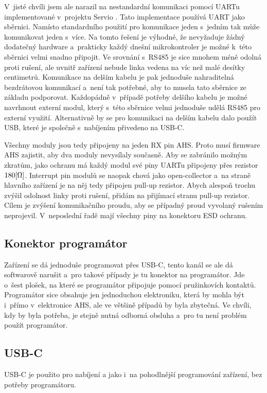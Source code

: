 V~jisté chvíli jsem ale narazil na nestandardní komunikaci pomocí UARTu implementované v~projektu Servio \cite{Servio}.
Tato implementace používá UART jako sběrnici.
Namísto standardního použití pro komunikace jeden s~jedním tak může komunikovat jeden s~více.
Na tomto řešení je výhodné, že nevyžaduje žádný dodatečný hardware a~prakticky každý dnešní mikrokontroler je možné k~této sběrnici velmi snadno připojit.
Ve srovnání s~RS485 je sice mnohem méně odolná proti rušení, ale uvnitř zařízení nebude linka vedena na víc než malé desítky centimetrů.
Komunikace na delším kabelu je pak jednoduše nahraditelná bezdrátovou komunikací a~není tak potřebné, aby to musela tato sběrnice ze základu podporovat.
Každopádně v~případě potřeby delšího kabelu je možné navrhnout externí modul, který s~této sběrnice velmi jednoduše udělá RS485 pro externí využití.
Alternativně by se pro komunikaci na delším kabelu dalo použít USB, které je společně s~nabíjením přivedeno na USB-C.

Všechny moduly jsou tedy připojeny na jeden RX pin AHS.
Proto musí firmware AHS zajistit, aby dva moduly nevysílaly současně.
Aby se zabránilo možným zkratům, jako ochranu má každý modul své piny UARTu připojeny přes rezistor \(180\-[\Omega]\).
Interrupt pin modulů se naopak chová jako open-collector a~na straně hlavního zařízení je na něj tedy připojen pull-up rezistor.
Abych alespoň trochu zvýšil odolnost linky proti rušení, přidám na přijímací stranu pull-up rezistor.
Cílem je zvýšení komunikačního proudu, aby se případný proud vyvolaný rušením neprojevil.
V~neposlední řadě mají všechny piny na konektoru ESD ochranu.

\newpage
\subsection{Konektor programátor}
Zařízení se dá jednoduše programovat přes USB-C, tento kanál se ale dá softwarově narušit a~pro takové případy je tu konektor na programátor.
Jde o~šest plošek, na které se programátor připojuje pomocí pružinkovích kontaktů.
Programátor sice obsahuje jen jednoduchou elektroniku, která by mohla být i~přímo v~elektronice AHS, ale ve většině případů by byla zbytečná.
Ve chvíli, kdy by byla potřeba, je stejně nutná odborná obsluha a~pro tu není problém použít programátor.

\subsection{USB-C}
USB-C je použito pro nabíjení a jako i~na pohodlnější programování zařízení, bez potřeby programátoru.

